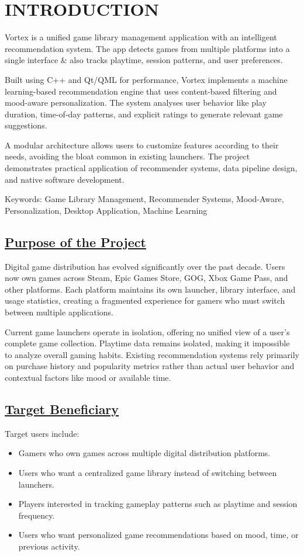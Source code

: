 \section{INTRODUCTION}
Vortex is a unified game library management application with an intelligent recommendation system. The app detects games from multiple platforms into a single interface \& also tracks playtime, session patterns, and user preferences.

Built using C++ and Qt/QML for performance, Vortex implements a machine learning-based recommendation engine that uses content-based filtering and mood-aware personalization. The system analyses user behavior like play duration, time-of-day patterns, and explicit ratings to generate relevant game suggestions.

A modular architecture allows users to customize features according to their needs, avoiding the bloat common in existing launchers. The project demonstrates practical application of recommender systems, data pipeline design, and native software development.

Keywords: Game Library Management, Recommender Systems, Mood-Aware, Personalization, Desktop Application, Machine Learning


\subsection{\underline{Purpose of the Project}}
Digital game distribution has evolved significantly over the past decade. Users now own games across Steam, Epic Games Store, GOG, Xbox Game Pass, and other platforms. Each platform maintains its own launcher, library interface, and usage statistics, creating a fragmented experience for gamers who must switch between multiple applications.

Current game launchers operate in isolation, offering no unified view of a user's complete game collection. Playtime data remains isolated, making it impossible to analyze overall gaming habits. Existing recommendation systems rely primarily on purchase history and popularity metrics rather than actual user behavior and contextual factors like mood or available time.

\subsection{\underline{Target Beneficiary}}
Target users include:

\begin{itemize}
    \item Gamers who own games across multiple digital distribution platforms.
    \item Users who want a centralized game library instead of switching between launchers.
    \item Players interested in tracking gameplay patterns such as playtime and session frequency.
    \item Users who want personalized game recommendations based on mood, time, or previous activity.
\end{itemize}

